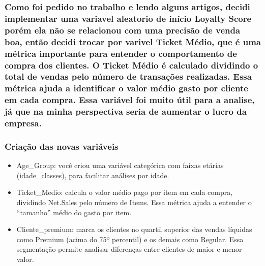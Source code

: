 \documentclass[
]{article}
\begin{document}
\subsubsection{Como foi pedido no trabalho e lendo alguns artigos,
decidi implementar uma variavel aleatorio de início Loyalty Score porém
ela não se relacionou com uma precisão de venda boa, então decidi trocar
por varivel Ticket Médio, que é uma métrica importante para entender o
comportamento de compra dos clientes. O Ticket Médio é calculado
dividindo o total de vendas pelo número de transações realizadas. Essa
métrica ajuda a identificar o valor médio gasto por cliente em cada
compra. Essa variável foi muito útil para a analise, já que na minha
perspectiva seria de aumentar o lucro da
empresa.}\label{como-foi-pedido-no-trabalho-e-lendo-alguns-artigos-decidi-implementar-uma-variavel-aleatorio-de-inuxedcio-loyalty-score-poruxe9m-ela-nuxe3o-se-relacionou-com-uma-precisuxe3o-de-venda-boa-entuxe3o-decidi-trocar-por-varivel-ticket-muxe9dio-que-uxe9-uma-muxe9trica-importante-para-entender-o-comportamento-de-compra-dos-clientes.-o-ticket-muxe9dio-uxe9-calculado-dividindo-o-total-de-vendas-pelo-nuxfamero-de-transauxe7uxf5es-realizadas.-essa-muxe9trica-ajuda-a-identificar-o-valor-muxe9dio-gasto-por-cliente-em-cada-compra.-essa-variuxe1vel-foi-muito-uxfatil-para-a-analise-juxe1-que-na-minha-perspectiva-seria-de-aumentar-o-lucro-da-empresa.}

\subsubsection{Criação das novas
variáveis}\label{criauxe7uxe3o-das-novas-variuxe1veis}

\begin{itemize}
\item
  Age\_Group: você criou uma variável categórica com faixas etárias
  (idade\_classes), para facilitar análises por idade.
\item
  Ticket\_Medio: calcula o valor médio pago por item em cada compra,
  dividindo Net.Sales pelo número de Items. Essa métrica ajuda a
  entender o ``tamanho'' médio do gasto por item.
\item
  Cliente\_premium: marca os clientes no quartil superior das vendas
  líquidas como Premium (acima do 75º percentil) e os demais como
  Regular. Essa segmentação permite analisar diferenças entre clientes
  de maior e menor valor.
\end{itemize}
\end{document}
